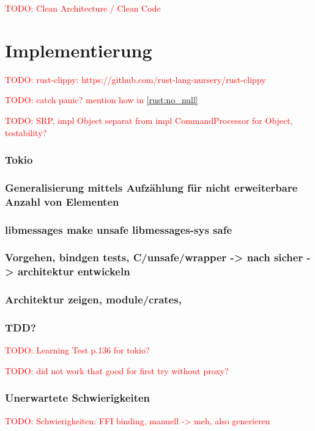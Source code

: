 \documentclass[
	12pt,
	table,
	bigheadings,
	ngerman,
	a4paper,
	BCOR5mm,
	DIV14,
	1.1headlines,
	pagesize,
	oneside,
	openright,
	titlepage,
	headsepline,
	nochapterprefix,
	bibtotoc,
	tocindent,
	listsindent,
	pointlessnumbers,
	cleardoubleempty,
	fleqn,
	halfparskip
]{scrbook}
\newcommand{\todo}[1]{\textcolor{red}{TODO: #1}}
\begin{document}
		\todo{Clean Architecture / Clean Code}
	
	\chapter{Implementierung}
	
	\todo{rust-clippy: https://github.com/rust-lang-nursery/rust-clippy}
	
	\todo{catch panic? mention how in \autoref{rust:no_null}}
	
	\todo{SRP, impl Object separat from impl CommandProcessor for Object, testability?}
	
	\subsection{Tokio}
	
		\subsection{Generalisierung mittels Aufzählung für nicht erweiterbare Anzahl von Elementen}
		
		\subsection{libmessages make unsafe libmessages-sys safe}
		
		\subsection{Vorgehen, bindgen tests, C/unsafe/wrapper -> nach sicher ->  architektur entwickeln}
		
		\subsection{Architektur zeigen, module/crates, }
	
		\subsection{TDD?}
		\todo{Learning Test p.136 for tokio?}
		
		\todo{did not work that good for first try without proxy?}
		
		\subsection{Unerwartete Schwierigkeiten}
		\label{impl:issue:ffi}
		\todo{Schwierigkeiten: FFI binding, manuell -> meh, also generieren}
			
\end{document}
